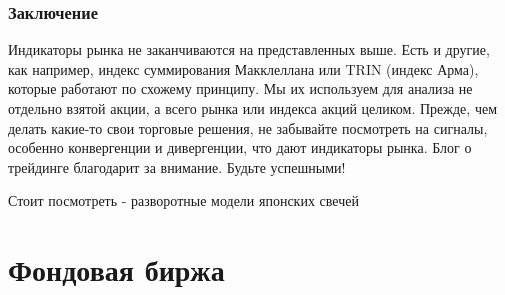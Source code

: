 \documentclass[a5paper]{article}
\begin{document}
\subsubsection{Заключение}

Индикаторы рынка не заканчиваются на представленных выше. Есть и другие, как например, индекс суммирования Макклеллана или TRIN (индекс Арма), которые работают по схожему принципу. Мы их используем для анализа не отдельно взятой акции, а всего рынка или индекса акций целиком. Прежде, чем делать какие-то свои торговые решения, не забывайте посмотреть на сигналы, особенно конвергенции и дивергенции, что дают индикаторы рынка. Блог о трейдинге благодарит за внимание. Будьте успешными!


Стоит посмотреть - разворотные модели японских свечей

\section{Фондовая биржа}
\end{document}
